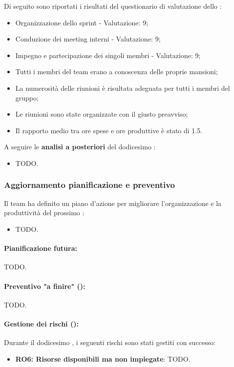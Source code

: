 \par Di seguito sono riportati i risultati del questionario di valutazione dello :
\begin{itemize}
  \item Organizzazione dello sprint - Valutazione: 9;
  \item Conduzione dei meeting interni - Valutazione: 9;
  \item Impegno e partecipazione dei singoli membri - Valutazione: 9;
  \item Tutti i membri del team erano a conoscenza delle proprie mansioni;
  \item La numerosità delle riunioni è risultata adeguata per tutti i membri del gruppo;
  \item Le riunioni sono state organizzate con il giusto preavviso;
  \item Il rapporto medio tra ore spese e ore produttive è stato di 1.5.
\end{itemize}

\vspace{0.5\baselineskip}
\par A seguire le \textbf{analisi a posteriori} del dodicesimo :
\begin{itemize}
  \item TODO.
\end{itemize}

\subsubsection{Aggiornamento pianificazione e preventivo}
\par Il team ha definito un piano d'azione per migliorare l'organizzazione e la produttività del prossimo :
\begin{itemize}
  \item TODO.
\end{itemize}

\paragraph*{Pianificazione futura:}
\par TODO.

\paragraph*{Preventivo "a finire" ():}
\par TODO.

\paragraph*{Gestione dei rischi ():}
\par Durante il dodicesimo , i seguenti rischi sono stati gestiti con successo:
\begin{itemize}
  \item \textbf{RO6: Risorse disponibili ma non impiegate}: TODO.
\end{itemize}